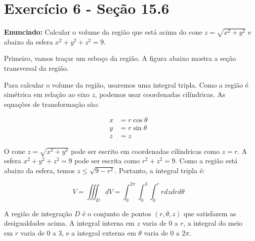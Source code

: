 \documentclass{article}
\begin{document}
\section*{Exercício 6 - Seção 15.6}
\textbf{Enunciado:} Calcular o volume da região que está acima do cone $z = \sqrt{x^2 + y^2}$ e abaixo da esfera $x^2 + y^2 + z^2 = 9$.

Primeiro, vamos traçar um esboço da região. A figura abaixo mostra a seção transversal da região. 

\begin{center}
\end{center}

Para calcular o volume da região, usaremos uma integral tripla. Como a região é simétrica em relação ao eixo $z$, podemos usar coordenadas cilíndricas. As equações de transformação são:

\begin{align*}
x &= r\cos\theta \\
y &= r\sin\theta \\
z &= z
\end{align*}

O cone $z = \sqrt{x^2 + y^2}$ pode ser escrito em coordenadas cilíndricas como $z = r$. A esfera $x^2 + y^2 + z^2 = 9$ pode ser escrita como $r^2 + z^2 = 9$. Como a região está abaixo da esfera, temos $z \leq \sqrt{9-r^2}$. Portanto, a integral tripla é:

\begin{equation*}
V = \iiint_D dV = \int_0^{2\pi} \int_0^3 \int_0^r r dz dr d\theta
\end{equation*}

A região de integração $D$ é o conjunto de pontos $(r, \theta, z)$ que satisfazem as desigualdades acima. A integral interna em $z$ varia de 0 a $r$, a integral do meio em $r$ varia de 0 a 3, e a integral externa em $\theta$ varia de 0 a $2\pi$.
\end{document}
